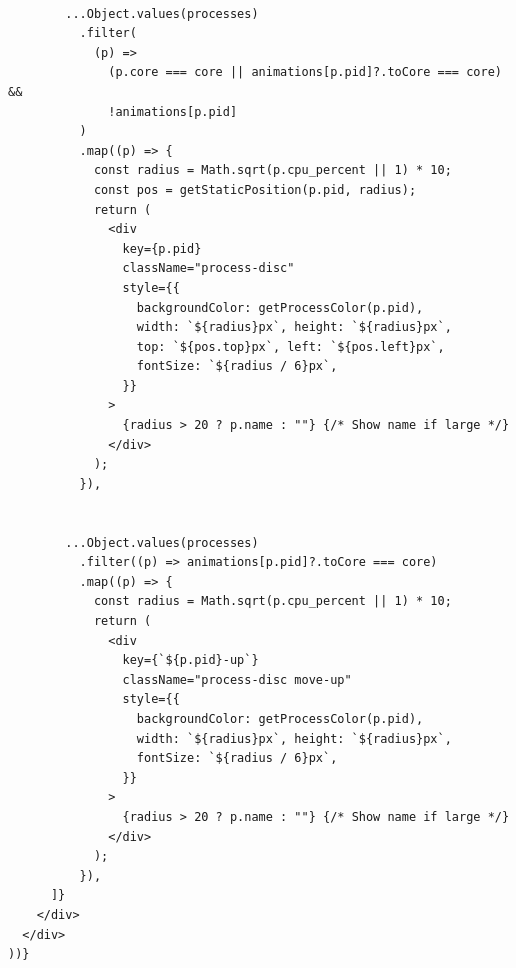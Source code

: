 \documentclass[12pt]{article}
\begin{document}
\begin{enumerate}
\begin{verbatim}
        
        ...Object.values(processes)
          .filter(
            (p) =>
              (p.core === core || animations[p.pid]?.toCore === core) &&
              !animations[p.pid] 
          )
          .map((p) => {
            const radius = Math.sqrt(p.cpu_percent || 1) * 10;
            const pos = getStaticPosition(p.pid, radius);
            return (
              <div
                key={p.pid}
                className="process-disc"
                style={{
                  backgroundColor: getProcessColor(p.pid), 
                  width: `${radius}px`, height: `${radius}px`, 
                  top: `${pos.top}px`, left: `${pos.left}px`, 
                  fontSize: `${radius / 6}px`, 
                }}
              >
                {radius > 20 ? p.name : ""} {/* Show name if large */}
              </div>
            );
          }),

        
        ...Object.values(processes)
          .filter((p) => animations[p.pid]?.toCore === core)
          .map((p) => {
            const radius = Math.sqrt(p.cpu_percent || 1) * 10;
            return (
              <div
                key={`${p.pid}-up`}
                className="process-disc move-up"
                style={{
                  backgroundColor: getProcessColor(p.pid), 
                  width: `${radius}px`, height: `${radius}px`, 
                  fontSize: `${radius / 6}px`, 
                }}
              >
                {radius > 20 ? p.name : ""} {/* Show name if large */}
              </div>
            );
          }),
      ]}
    </div>
  </div>
))}

\end{verbatim}
\end{enumerate}
\end{document}
